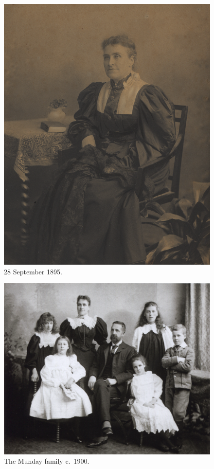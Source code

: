 \begin{figure}
	\centering
	\includegraphics{photos/Catherine_Aldridge_1895-09-28.png}
	\caption{28 September 1895.}
\end{figure}

\begin{figure}
	\centering
	\label{MundayFamilyPhoto}
	\includegraphics{photos/Munday_family}
	\caption{The Munday family c.~1900.\cite{MundayFamilyPhoto}}
\end{figure}


